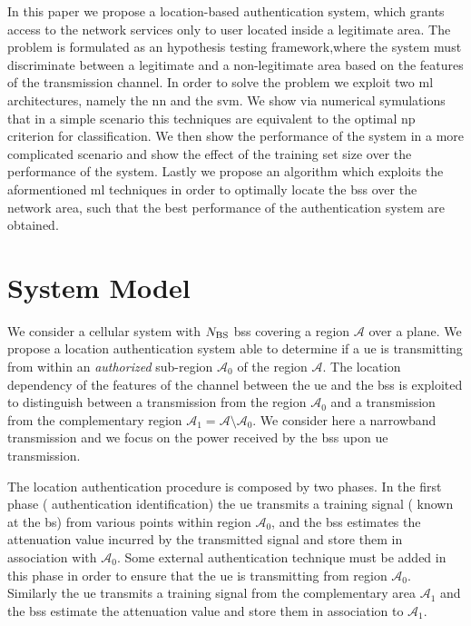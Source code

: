 \documentclass[twocolumns]{IEEEtran}
\begin{document}
In this paper we propose a location-based authentication system, which grants access to the network services only to user located inside a legitimate area. The problem is formulated as an hypothesis testing framework,where the system must discriminate between a legitimate and a non-legitimate area based on the features of the transmission channel. In order to solve the problem we exploit two \ac{ml} architectures, namely the \ac{nn} and the \ac{svm}. We show via numerical symulations that in a simple scenario this techniques are equivalent to the optimal \ac{np} criterion for classification. We then show the performance of the system in a more complicated scenario and show the effect of the training set size over the performance of the system. Lastly we propose an algorithm which exploits the aformentioned \ac{ml} techniques in order to optimally locate the \acp{bs} over the network area, such that the best performance of the authentication system are obtained.



\section{System Model}
We consider a cellular system with $N_{\rm BS}$ \acp{bs} covering a region $\mathcal{A}$ over a plane. We propose a location authentication system able to determine if a \ac{ue} is transmitting from within an {\em authorized} sub-region $\mathcal{A}_0$ of the region $\mathcal{A}$. The location dependency of the features of the channel between the \ac{ue} and the \acp{bs} is exploited to distinguish between a transmission from the region $\mathcal{A_0}$ and a transmission from the complementary region $\mathcal{A}_1=\mathcal{A} \setminus \mathcal{A}_0$. We consider here a narrowband transmission and we focus on the power received by the \acp{bs} upon \ac{ue} transmission.

The location authentication procedure is composed by two phases. In the first phase ( authentication identification) the \ac{ue} transmits a training signal ( known at the \acs{bs}) from various points within region $\mathcal{A}_0$, and the \acp{bs} estimates the attenuation value incurred by the transmitted signal and store them in association with $\mathcal{A}_0$. Some external authentication technique must be added in this phase in order to ensure that the \ac{ue} is transmitting from region $\mathcal{A}_0$. Similarly the \ac{ue} transmits a training signal from the complementary area $\mathcal{A}_1$ and the \acp{bs} estimate the attenuation value and store them in association to $\mathcal{A}_1$.
\end{document}
